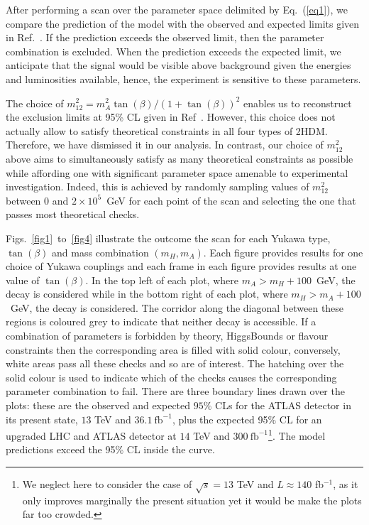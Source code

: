 After performing a scan over the parameter space delimited by Eq.~(\ref{eq1}), we compare the prediction of the model with the observed and expected limits given in Ref.~\cite{Aaboud:2018eoy}.
If the prediction exceeds the observed limit, then the parameter combination is excluded.
When the prediction exceeds the expected limit, we anticipate that the signal would be visible above background given the energies and luminosities available, hence,  {the experiment is sensitive to these parameters.} %



The choice of \(m^2_{12} = m_A^2 \tan(\beta) / (1 + \tan(\beta))^2\) enables us to reconstruct the exclusion limits at 95\%  CL given in Ref~\cite{Aaboud:2018eoy}.
However, this choice does not actually allow to satisfy theoretical constraints in all four types of 2HDM.
Therefore, we have dismissed it in our analysis.
In contrast, our choice of \(m_{12}^2\) above aims to simultaneously satisfy as many theoretical constraints as possible while affording one with significant parameter space amenable to experimental investigation.
Indeed, this is achieved by randomly sampling values of \(m^2_{12}\) between \(0\) and \(2\times 10^{5}\)~GeV for each point of the scan and selecting the one that passes most theoretical checks.



Figs.~\ref{fig1}~to~\ref{fig4} illustrate the outcome the scan for each
Yukawa type, \(\tan(\beta)\) and mass combination $(m_H,m_A)$.
Each figure provides results for one choice of Yukawa couplings
and each frame in each figure provides results at one value of \(\tan(\beta)\).
In the top left of each plot, where \(m_A > m_H+100\)~GeV, the decay \AZH{} is considered while 
in the bottom right of each plot, where \(m_H > m_A+100\)~GeV,   the decay \HZA{} is considered.
The corridor along the diagonal between these regions is coloured grey to indicate that neither decay is accessible.
%
If a combination of parameters is forbidden by theory, HiggsBounds or flavour constraints
then the corresponding area is filled with solid colour, conversely,
white areas pass all these checks and so are of interest. The hatching over the solid colour is used to indicate which of the checks
causes the corresponding parameter combination to fail.
There are three boundary lines drawn over the plots: 
these are the observed and expected \(95\%\) CLs for the ATLAS detector in its present state, \(13\) TeV and \(36.1~\text{fb}^{-1}\),
plus the expected 95\% CL for an upgraded LHC and ATLAS detector at \(14\) TeV and \(300~\text{fb}^{-1}\)\footnote{We neglect here to consider the case of $\sqrt s=13$ TeV and $L\approx140$ fb$^{-1}$, as it only improves marginally the present situation yet it would be make the plots far too crowded.}.
The model predictions exceed the 95\% CL inside the curve.

